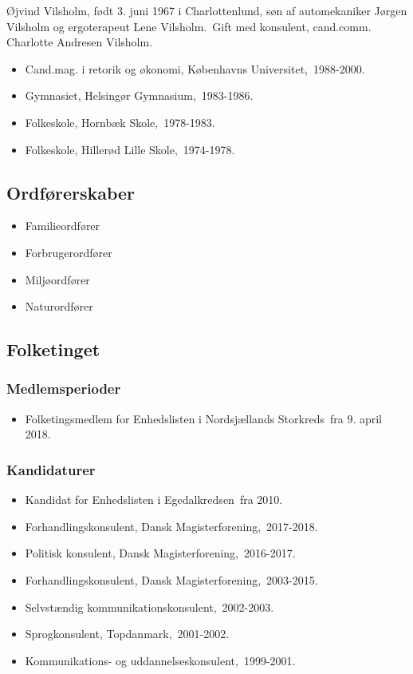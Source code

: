 \documentclass[11pt, a4paper]{awesome-cv}
\begin{document}
\makecvheader[R]
\makelettertitle
\begin{cvletter}
Øjvind Vilsholm, født 3. juni 1967 i Charlottenlund, søn af automekaniker Jørgen Vilsholm og ergoterapeut Lene Vilsholm. Gift med konsulent, cand.comm. Charlotte Andresen Vilsholm.

\begin{itemize}
\item Cand.mag. i retorik og økonomi, Københavns Universitet, 1988-2000.
\item Gymnasiet, Helsingør Gymnasium, 1983-1986.
\item Folkeskole, Hornbæk Skole, 1978-1983.
\item Folkeskole, Hillerød Lille Skole, 1974-1978.
\end{itemize}
\subsection*{Ordførerskaber}
\begin{itemize}
\item Familieordfører
\item Forbrugerordfører
\item Miljøordfører
\item Naturordfører
\end{itemize}
\subsection*{Folketinget}
\subsubsection*{Medlemsperioder}
\begin{itemize}
\item Folketingsmedlem for Enhedslisten i Nordsjællands Storkreds fra 9. april 2018.
\end{itemize}
\subsubsection*{Kandidaturer}
\begin{itemize}
\item Kandidat for Enhedslisten i Egedalkredsen fra 2010.
\end{itemize}
\begin{itemize}
\item Forhandlingskonsulent, Dansk Magisterforening, 2017-2018.
\item Politisk konsulent, Dansk Magisterforening, 2016-2017.
\item Forhandlingskonsulent, Dansk Magisterforening, 2003-2015.
\item Selvstændig kommunikationskonsulent, 2002-2003.
\item Sprogkonsulent, Topdanmark, 2001-2002.
\item Kommunikations- og uddannelseskonsulent, 1999-2001.
\end{itemize}
\end{cvletter}
\end{document}
